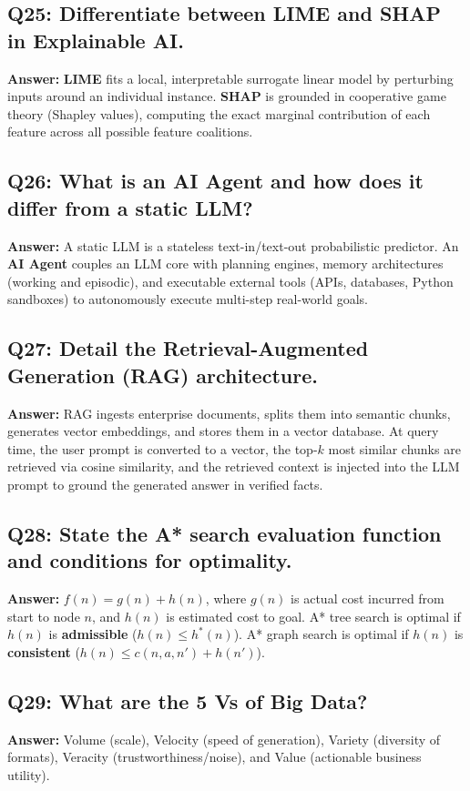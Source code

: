\subsection*{Q25: Differentiate between LIME and SHAP in Explainable AI.}
\textbf{Answer:} \textbf{LIME} fits a local, interpretable surrogate linear model by perturbing inputs around an individual instance. \textbf{SHAP} is grounded in cooperative game theory (Shapley values), computing the exact marginal contribution of each feature across all possible feature coalitions.

\subsection*{Q26: What is an AI Agent and how does it differ from a static LLM?}
\textbf{Answer:} A static LLM is a stateless text-in/text-out probabilistic predictor. An \textbf{AI Agent} couples an LLM core with planning engines, memory architectures (working and episodic), and executable external tools (APIs, databases, Python sandboxes) to autonomously execute multi-step real-world goals.

\subsection*{Q27: Detail the Retrieval-Augmented Generation (RAG) architecture.}
\textbf{Answer:} RAG ingests enterprise documents, splits them into semantic chunks, generates vector embeddings, and stores them in a vector database. At query time, the user prompt is converted to a vector, the top-$k$ most similar chunks are retrieved via cosine similarity, and the retrieved context is injected into the LLM prompt to ground the generated answer in verified facts.

\subsection*{Q28: State the A* search evaluation function and conditions for optimality.}
\textbf{Answer:} $f(n) = g(n) + h(n)$, where $g(n)$ is actual cost incurred from start to node $n$, and $h(n)$ is estimated cost to goal. A* tree search is optimal if $h(n)$ is \textbf{admissible} ($h(n) \le h^*(n)$). A* graph search is optimal if $h(n)$ is \textbf{consistent} ($h(n) \le c(n, a, n') + h(n')$).

\subsection*{Q29: What are the 5 Vs of Big Data?}
\textbf{Answer:} Volume (scale), Velocity (speed of generation), Variety (diversity of formats), Veracity (trustworthiness/noise), and Value (actionable business utility).


